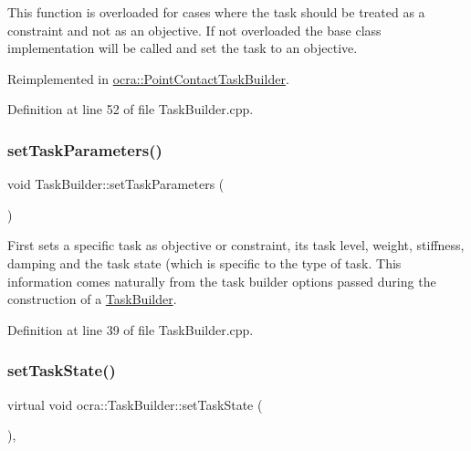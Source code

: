 This function is overloaded for cases where the task should be treated as a constraint and not as an objective. If not overloaded the base class implementation will be called and set the task to an objective. 

Reimplemented in \hyperlink{classocra_1_1PointContactTaskBuilder_a729f50dc73c00accb86a9480cb3054fd}{ocra\+::\+Point\+Contact\+Task\+Builder}.



Definition at line 52 of file Task\+Builder.\+cpp.

\hypertarget{classocra_1_1TaskBuilder_a646ca4a01affbb2aa82cfdde32e8be66}{}\label{classocra_1_1TaskBuilder_a646ca4a01affbb2aa82cfdde32e8be66} 
\subsubsection{\texorpdfstring{set\+Task\+Parameters()}{setTaskParameters()}}
{\footnotesize\ttfamily void Task\+Builder\+::set\+Task\+Parameters (\begin{DoxyParamCaption}{ }\end{DoxyParamCaption})}

First sets a specific task as objective or constraint, its task level, weight, stiffness, damping and the task state (which is specific to the type of task. This information comes naturally from the task builder options passed during the construction of a \hyperlink{classocra_1_1TaskBuilder}{Task\+Builder}. 

Definition at line 39 of file Task\+Builder.\+cpp.

\hypertarget{classocra_1_1TaskBuilder_a7b44bfa101566ea4400e2d9bfdb9ff32}{}\label{classocra_1_1TaskBuilder_a7b44bfa101566ea4400e2d9bfdb9ff32} 
\subsubsection{\texorpdfstring{set\+Task\+State()}{setTaskState()}}
{\footnotesize\ttfamily virtual void ocra\+::\+Task\+Builder\+::set\+Task\+State (\begin{DoxyParamCaption}{ }\end{DoxyParamCaption})\hspace{0.3cm}{\ttfamily [protected]}, {}}



